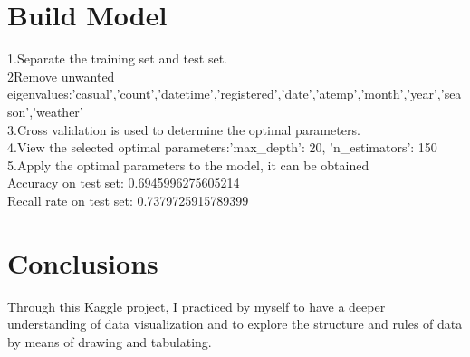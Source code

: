 \section{Build Model}
1.Separate the training set and test set.\\
2Remove unwanted eigenvalues:'casual','count','datetime','registered','date','atemp','month','year','season','weather'\\
3.Cross validation is used to determine the optimal parameters.\\
4.View the selected optimal parameters:{'max_depth': 20, 'n_estimators': 150}\\
5.Apply the optimal parameters to the model, it can be obtained\\
Accuracy on test set:  0.6945996275605214\\
Recall rate on test set: 0.7379725915789399

\section{Conclusions}

Through this Kaggle project, I practiced by myself to have a deeper understanding of data visualization and to explore the structure and rules of data by means of drawing and tabulating.
